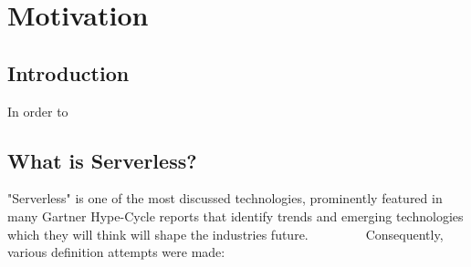 \chapter{Motivation}\label{chp:motivation}


\section{Introduction}

In order to 

\section{What is Serverless?}\label{sec:whatIsServerless}

"Serverless" is one of the most discussed technologies, prominently featured in many Gartner Hype-Cycle reports that identify trends and emerging technologies which they will think will shape the industries future. 
~\highcomma
~\highcomma
~\highcomma
~\highcomma
~
Consequently, various definition attempts were made:


